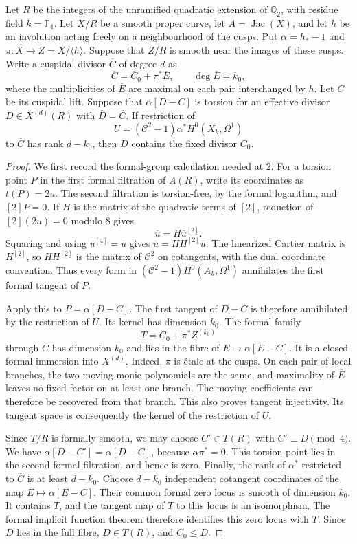 \begin{lemma}\label{lem:decic-relative-formal-F4}
Let $R$ be the integers of the unramified quadratic extension of
$\mathbb Q_2$, with residue field $k=\mathbb F_4$.
Let $X/R$ be a smooth proper curve, let $A=\operatorname{Jac}(X)$,
and let $h$ be an involution acting freely on a neighbourhood of
the cusps. Put $\alpha=h_*-1$ and $\pi:X\to Z=X/\langle h\rangle$.
Suppose that $Z/R$ is smooth near the images of these cusps.
Write a cuspidal divisor $\overline C$ of degree $d$ as
\[
              \overline C=\overline C_0+\pi^*\overline E,
              \qquad \deg\overline E=k_0,
\]
where the multiplicities of $\overline E$ are maximal on each
pair interchanged by $h$. Let $C$ be its cuspidal lift.
Suppose that $\alpha[D-C]$ is torsion for an effective divisor
$D\in X^{(d)}(R)$ with $\overline D=\overline C$.
If restriction of
\[
 U=(\mathcal C^2-1)\alpha^*H^0(X_k,\Omega^1)
\]
to $\overline C$ has rank $d-k_0$, then $D$ contains the fixed
divisor $C_0$.
\end{lemma}
\begin{proof}
We first record the formal-group calculation needed at $2$.
For a torsion point $P$ in the first formal filtration of $A(R)$,
write its coordinates as $t(P)=2u$. The second filtration is
torsion-free, by the formal logarithm, and $[2]P=0$.
If $H$ is the matrix of the quadratic terms of $[2]$, reduction
of $[2](2u)=0$ modulo $8$ gives
\[
                   \overline u=H\overline u^{[2]}.
\]
Squaring and using $\overline u^{[4]}=\overline u$ gives
$\overline u=HH^{[2]}\overline u$.
The linearized Cartier matrix is $H^{[2]}$, so $HH^{[2]}$
is the matrix of $\mathcal C^2$ on cotangents, with the dual
coordinate convention. Thus every form in
$(\mathcal C^2-1)H^0(A_k,\Omega^1)$ annihilates the first
formal tangent of $P$.

Apply this to $P=\alpha[D-C]$.
The first tangent of $D-C$ is therefore annihilated by the
restriction of $U$. Its kernel has dimension $k_0$.
The formal family
\[
                  T=C_0+\pi^*Z^{(k_0)}
\]
through $C$ has dimension $k_0$ and lies in the fibre of
$E\mapsto\alpha[E-C]$.
It is a closed formal immersion into $X^{(d)}$.
Indeed, $\pi$ is \'etale at the cusps. On each pair of local
branches, the two moving monic polynomials are the same, and
maximality of $\overline E$ leaves no fixed factor on at least
one branch. The moving coefficients can therefore be recovered
from that branch. This also proves tangent injectivity.
Its tangent space is consequently the kernel of the restriction
of $U$.

Since $T/R$ is formally smooth, we may choose $C'\in T(R)$
with $C'\equiv D\pmod4$. We have
$\alpha[D-C']=\alpha[D-C]$, because $\alpha\pi^*=0$.
This torsion point lies in the second formal filtration, and
hence is zero.
Finally, the rank of $\alpha^*$ restricted to $\overline C$
is at least $d-k_0$. Choose $d-k_0$ independent cotangent
coordinates of the map $E\mapsto\alpha[E-C]$.
Their common formal zero locus is smooth of dimension $k_0$.
It contains $T$, and the tangent map of $T$ to this locus is an
isomorphism. The formal implicit function theorem therefore
identifies this zero locus with $T$. Since $D$ lies in the full
fibre, $D\in T(R)$, and $C_0\leq D$.
\end{proof}
